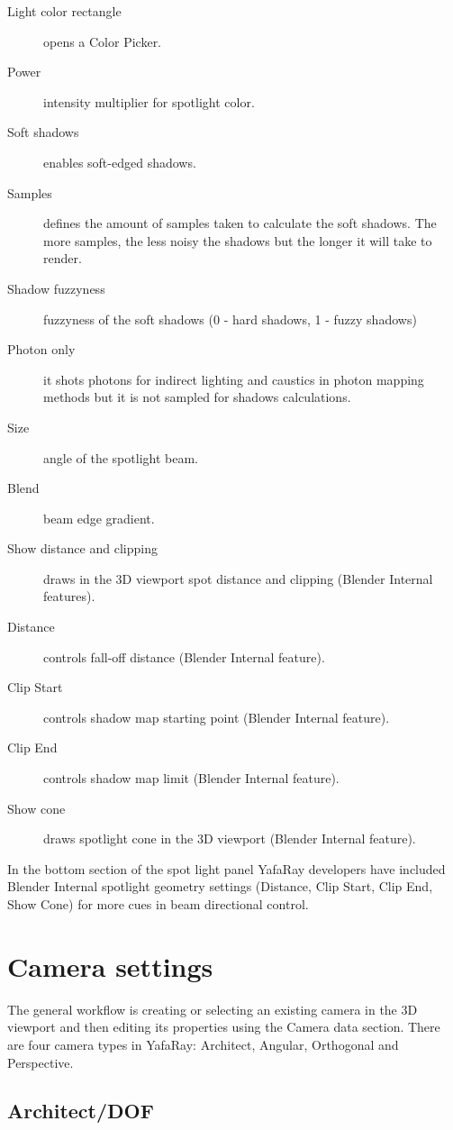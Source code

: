 \begin{description}
\item[Light color rectangle] opens a Color Picker.
\item[Power] intensity multiplier for spotlight color.
\item[Soft shadows] enables soft-edged shadows.
\item[Samples] defines the amount of samples taken to calculate the soft shadows. The more samples, the less noisy the shadows but the longer it will take to render.
\item[Shadow fuzzyness] fuzzyness of the soft shadows (0 - hard shadows, 1 - fuzzy shadows)
\item[Photon only] it shots photons for indirect lighting and caustics in photon mapping methods but it is not sampled for shadows calculations.
\item[Size] angle of the spotlight beam.
\item[Blend] beam edge gradient.
\item[Show distance and clipping] draws in the 3D viewport spot distance and clipping (Blender Internal features).
\item[Distance] controls fall-off distance (Blender Internal feature).
\item[Clip Start] controls shadow map starting point (Blender Internal feature).
\item[Clip End] controls shadow map limit (Blender Internal feature).
\item[Show cone] draws spotlight cone in the 3D viewport (Blender Internal feature).
\end{description}

In the bottom section of the spot light panel YafaRay developers have included Blender Internal spotlight geometry settings (Distance, Clip Start, Clip End, Show Cone) for more cues in beam directional control.

\section{Camera settings}

The general workflow is creating or selecting an existing camera in the 3D viewport and then editing its properties using the Camera data section. There are four camera types in YafaRay: Architect, Angular, Orthogonal and Perspective.

\subsection{Architect/DOF}

